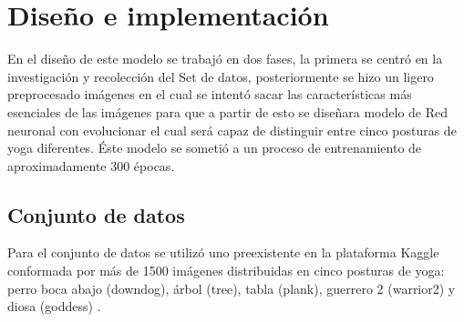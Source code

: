 \documentclass[journal]{IEEEtran}
\begin{document}
\section{Diseño e implementación}

En el diseño de este modelo se trabajó en dos fases, la primera se centró en la investigación y recolección del Set de datos, posteriormente se hizo un ligero preprocesado imágenes en el cual se intentó sacar las características más esenciales de las imágenes para que a partir de esto se diseñara modelo de Red neuronal con evolucionar el cual será capaz de distinguir entre cinco posturas de yoga diferentes. Éste modelo se sometió a un proceso de entrenamiento de aproximadamente 300 épocas.

\subsection{Conjunto de datos}
Para el conjunto de datos se utilizó uno preexistente en la plataforma Kaggle conformada por más de 1500 imágenes distribuidas en cinco posturas de yoga: perro boca abajo (downdog), árbol (tree), tabla (plank), guerrero 2 (warrior2) y diosa (goddess) \cite{pandit_2020}. 
\end{document}

